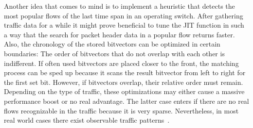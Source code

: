 \documentclass[a4paper,
		12pt,
		parskip=full,
		titlepage
		]{scrartcl}
\begin{document}
Another idea that comes to mind is to implement a heuristic that detects 
the most popular flows of the last time span in an operating switch.
After gathering traffic data for a while it might prove beneficial to tune 
the JIT function in such a way that the search for packet header data in a popular flow returns faster.
Also, the chronology of the stored bitvectors can be optimized in certain boundaries:
The order of bitvectors that do not overlap with each other is indifferent.
If often used bitvectors are placed closer to the front, the matching process 
can be sped up because it scans the result bitvector from left to right for the first set bit.
However, if bitvectors overlap, their relative order must remain.
Depending on the type of traffic, these optimizations may either cause a massive performance boost or no real advantage.
The latter case enters if there are no real flows recognizable in the traffic because it is very sparse.
Nevertheless, in most real world cases there exist observable traffic patterns~\cite{elephantmice}.

\newpage
{}


\end{document}
